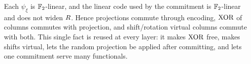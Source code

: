 \begin{remark}
\label{rem:linearity-thread}
Each $\psi_\xi$ is $\mathbb{F}_2$-linear, and the linear code used by the
commitment is $\mathbb{F}_2$-linear and does not widen $R$. Hence
projections commute through encoding, $\operatorname{XOR}$ of columns commutes with
projection, and shift/rotation virtual columns commute with both. This
single fact is reused at every layer: it makes $\operatorname{XOR}$ free, makes shifts
virtual, lets the random projection be applied after committing, and lets
one commitment serve many functionals.
\end{remark}
